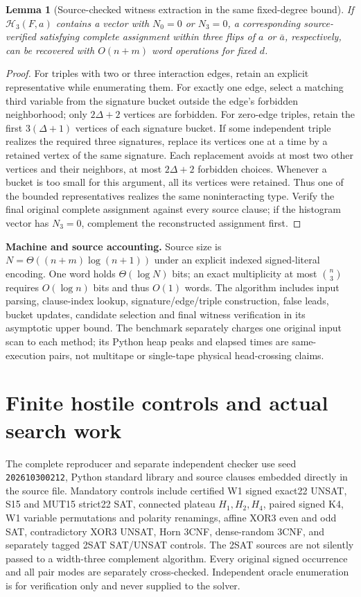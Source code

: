 \documentclass[11pt]{article}
\newtheorem{lemma}{Lemma}
\begin{document}
\begin{lemma}[Source-checked witness extraction in the same fixed-degree bound]
If $\mathcal H_3(F,a)$ contains a vector with $N_0=0$ or $N_3=0$, a corresponding source-verified satisfying complete assignment within three flips of $a$ or $\bar a$, respectively, can be recovered with $O(n+m)$ word operations for fixed $d$.
\end{lemma}
\begin{proof}
For triples with two or three interaction edges, retain an explicit representative while enumerating them. For exactly one edge, select a matching third variable from the signature bucket outside the edge's forbidden neighborhood; only $2\Delta+2$ vertices are forbidden. For zero-edge triples, retain the first $3(\Delta+1)$ vertices of each signature bucket. If some independent triple realizes the required three signatures, replace its vertices one at a time by a retained vertex of the same signature. Each replacement avoids at most two other vertices and their neighbors, at most $2\Delta+2$ forbidden choices. Whenever a bucket is too small for this argument, all its vertices were retained. Thus one of the bounded representatives realizes the same noninteracting type. Verify the final original complete assignment against every source clause; if the histogram vector has $N_3=0$, complement the reconstructed assignment first.
\end{proof}

\noindent\textbf{Machine and source accounting.} Source size is $N=\Theta((n+m)\log(n+1))$ under an explicit indexed signed-literal encoding. One word holds $\Theta(\log N)$ bits; an exact multiplicity at most $\binom n3$ requires $O(\log n)$ bits and thus $O(1)$ words. The algorithm includes input parsing, clause-index lookup, signature/edge/triple construction, false leads, bucket updates, candidate selection and final witness verification in its asymptotic upper bound. The benchmark separately charges one original input scan to each method; its Python heap peaks and elapsed times are same-execution pairs, not multitape or single-tape physical head-crossing claims.

\section{Finite hostile controls and actual search work}
The complete reproducer and separate independent checker use seed \texttt{202610300212}, Python standard library and source clauses embedded directly in the source file. Mandatory controls include certified W1 signed exact22 UNSAT, S15 and MUT15 strict22 SAT, connected plateau $H_1,H_2,H_4$, paired signed K4, W1 variable permutations and polarity renamings, affine XOR3 even and odd SAT, contradictory XOR3 UNSAT, Horn 3CNF, dense-random 3CNF, and separately tagged 2SAT SAT/UNSAT controls. The 2SAT sources are not silently passed to a width-three complement algorithm. Every original signed occurrence and all pair modes are separately cross-checked. Independent oracle enumeration is for verification only and never supplied to the solver.
\end{document}
